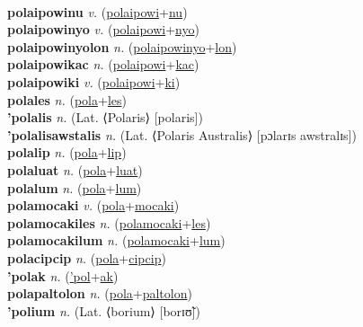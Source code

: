  \label{polaipowilyan} \\
\textbf{polaipowinu} \textit{v.} (\hyperref[polaipowi]{polaipowi}+\hyperref[nu]{nu})
 \label{polaipowinu} \\
\textbf{polaipowinyo} \textit{v.} (\hyperref[polaipowi]{polaipowi}+\hyperref[nyo]{nyo})
 \label{polaipowinyo} \\
\textbf{polaipowinyolon} \textit{n.} (\hyperref[polaipowinyo]{polaipowinyo}+\hyperref[lon]{lon})
 \label{polaipowinyolon} \\
\textbf{polaipowikac} \textit{n.} (\hyperref[polaipowi]{polaipowi}+\hyperref[kac]{kac})
 \label{polaipowikac} \\
\textbf{polaipowiki} \textit{v.} (\hyperref[polaipowi]{polaipowi}+\hyperref[ki]{ki})
 \label{polaipowiki} \\
\textbf{polales} \textit{n.} (\hyperref[pola]{pola}+\hyperref[les]{les})
 \label{polales} \\
\textbf{'polalis} \textit{n.} (Lat. ⟨Polaris⟩ [polaris])
 \label{'polalis} \\
\textbf{'polalisawstalis} \textit{n.} (Lat. ⟨Polaris Australis⟩ [pɔlarɪs awstralɪs])
 \label{'polalisawstalis} \\
\textbf{polalip} \textit{n.} (\hyperref[pola]{pola}+\hyperref[lip]{lip})
 \label{polalip} \\
\textbf{polaluat} \textit{n.} (\hyperref[pola]{pola}+\hyperref[luat]{luat})
 \label{polaluat} \\
\textbf{polalum} \textit{n.} (\hyperref[pola]{pola}+\hyperref[lum]{lum})
 \label{polalum} \\
\textbf{polamocaki} \textit{v.} (\hyperref[pola]{pola}+\hyperref[mocaki]{mocaki})
 \label{polamocaki} \\
\textbf{polamocakiles} \textit{n.} (\hyperref[polamocaki]{polamocaki}+\hyperref[les]{les})
 \label{polamocakiles} \\
\textbf{polamocakilum} \textit{n.} (\hyperref[polamocaki]{polamocaki}+\hyperref[lum]{lum})
 \label{polamocakilum} \\
\textbf{polacipcip} \textit{n.} (\hyperref[pola]{pola}+\hyperref[cipcip]{cipcip})
 \label{polacipcip} \\
\textbf{'polak} \textit{n.} (\hyperref['pol]{'pol}+\hyperref[ak]{ak})
 \label{'polak} \\
\textbf{polapaltolon} \textit{n.} (\hyperref[pola]{pola}+\hyperref[paltolon]{paltolon})
 \label{polapaltolon} \\
\textbf{'polium} \textit{n.} (Lat. ⟨borium⟩ [borɪʊ̃])
 \label{'polium} \\
